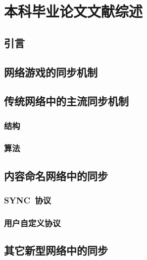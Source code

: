 \chapter{本科毕业论文文献综述}


\section{引言}

\section{网络游戏的同步机制}

\section{传统网络中的主流同步机制}
\subsection{结构}
\subsection{算法}

\section{内容命名网络中的同步}

\subsection{SYNC~协议}

\subsection{用户自定义协议}

\section{其它新型网络中的同步}

